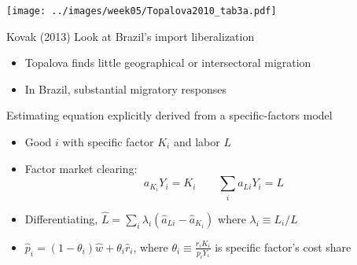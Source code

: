 \documentclass[11pt,notes=hide,aspectratio=169]{beamer}
\begin{document}
\begin{frame}{}
\begin{center}
\texttt{[image: ../images/week05/Topalova2010\_tab3a.pdf]}
\end{center}
\end{frame}
\begin{frame}{Kovak (2013)}
Look at Brazil's import liberalization
\begin{itemize}
	\item Topalova finds little geographical or intersectoral migration
	\item In Brazil, substantial migratory responses
\end{itemize}
Estimating equation explicitly derived from a specific-factors model
\begin{itemize}
	\item Good $i$ with specific factor $K_i$ and labor $L$
	\item Factor market clearing:
	\begin{equation*}
	a_{K_i} Y_i = K_i \qquad \sum_{i} a_{Li} Y_i = L
	\end{equation*}
	\item Differentiating, $\hat{L} = \sum_i \lambda_i (\hat{a}_{Li} - \hat{a}_{K_i})$ where $\lambda_i \equiv L_i / L$
	\item $\hat{p}_i = (1-\theta_i)\hat{w} + \theta_i \hat{r}_i$, where $\theta_i \equiv \frac{r_iK_i}{p_i Y_i}$ is specific factor's cost share
\end{itemize}
\end{frame}
\end{document}
